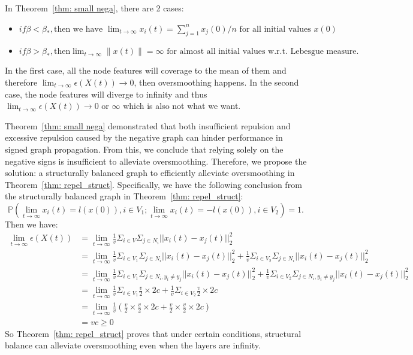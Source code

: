 In Theorem~\ref{thm: small nega}, there are 2 cases: 
\begin{itemize}
    \item $if \beta < \beta_*, \text{then we have }\lim_{t \to \infty} x_i(t) = \sum_{j=1}^n x_j(0)/n     \text{ for all initial values }x(0)$
    \item $if \beta > \beta_*, \text{then} \lim_{t \to \infty} \|x(t)\| = \infty \text{ for almost all initial values w.r.t. Lebesgue measure}.$
\end{itemize}
In the first case, all the node features will coverage to the mean of them and therefore $\lim_{t \to \infty}\epsilon(X(t))\to 0$, then oversmoothing happens.
In the second case, the node features will diverge to infinity and thus $\lim_{t \to \infty}\epsilon(X(t))\to 0 \text{ or } \infty$ which is also not what we want. 

Theorem~\ref{thm: small nega} demonstrated that both insufficient repulsion and excessive repulsion caused by the negative graph can hinder performance in signed graph propagation.
From this, we conclude that relying solely on the negative signs is insufficient to alleviate oversmoothing.
Therefore, we propose the  solution: a structurally balanced graph to efficiently alleviate oversmoothing in Theorem~\ref{thm: repel_struct}.
Specifically, we have the following conclusion from the structurally balanced graph in Theorem~\ref{thm: repel_struct}:
\begin{equation}
    \mathbb{P}\left(\lim_{t \to \infty} x_i(t) = l(x(0)), i \in V_1; \lim_{t \to \infty} x_i(t) = -l(x(0)), i \in V_2 \right) = 1.
\end{equation}
Then we have:
\begin{align}
    \lim_{t \to \infty}\epsilon(X(t))&=\lim_{t \to \infty}\frac{1}{v}\Sigma_{i\in V}\Sigma_{j \in N_i}||x_i(t)-x_j(t)||^2_2 \\
    & =\lim_{t \to \infty}\frac{1}{v}\Sigma_{i \in V_1}\Sigma_{j \in N_i}||x_i(t)-x_j(t)||_2^2+ \frac{1}{v}\Sigma_{i \in V_2}\Sigma_{j \in N_i}||x_i(t)-x_j(t)||_2^2 \\
    & =\lim_{t \to \infty}\frac{1}{v}\Sigma_{i\in V_1}\Sigma_{j \in N_i, y_i \neq y_j}||x_i(t)-x_j(t)||_2^2+ \frac{1}{v}\Sigma_{i\in V_2}\Sigma_{j \in N_i, y_i \neq y_j}||x_i(t)-x_j(t)||_2^2 \\
    & =\lim_{t \to \infty}\frac{1}{v}\Sigma_{i\in V_1}\frac{v}{2}\times2c+ \frac{1}{v}\Sigma_{i\in V_2}\frac{v}{2}\times2c \\
    & =\lim_{t \to \infty}\frac{1}{v}(\frac{v}{2}\times \frac{v}{2}\times2c+ \frac{v}{2}\times\frac{v}{2}\times2c) \\
    & =vc\geq 0 
\end{align}
So Theorem~\ref{thm: repel_struct} proves that under certain conditions, structural balance can alleviate oversmoothing even when the layers are infinity.




